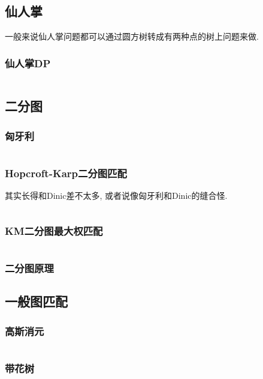 \documentclass[a4paper, twoside]{article}
\begin{document}
\begin{multicols}{2}
			\subsection{仙人掌}
				一般来说仙人掌问题都可以通过圆方树转成有两种点的树上问题来做.
				\subsubsection{仙人掌DP}
					\inputminted{cpp}{../src/graph/仙人掌DP.cpp}
			
			\subsection{二分图}
				\subsubsection{匈牙利}
					\inputminted{cpp}{../src/graph/hungary.cpp}

				\subsubsection{Hopcroft-Karp二分图匹配}
					其实长得和Dinic差不太多, 或者说像匈牙利和Dinic的缝合怪.
					\inputminted{cpp}{../src/graph/hopcroft-karp.cpp}

				\subsubsection{KM二分图最大权匹配}
					\inputminted{cpp}{../src/graph/KM二分图最大权匹配.cpp}

				\subsubsection{二分图原理}
					
			
			\subsection{一般图匹配}
				\subsubsection{高斯消元}
					\inputminted{cpp}{../src/graph/基于线性代数的一般图匹配.cpp}

				\subsubsection{带花树}
					\inputminted{cpp}{../src/graph/带花树.cpp}
				

\end{multicols}
\end{document}
